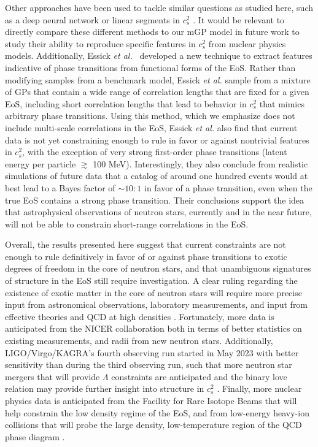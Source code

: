 \documentclass[aps,prd,nofootinbib,tightenlines,notitlepage,floatfix,superscriptaddress,showkeys,twocolumn]{revtex4-1}
\begin{document}
Other approaches have been used to tackle similar questions as studied here, such as a deep neural network \cite{Fujimoto:2019hxv} or linear segments in $c_s^2$ \cite{Somasundaram:2021clp}. It would be relevant to directly compare these different methods to our mGP model in future work to study their ability to reproduce specific features in $c_s^2$ from nuclear physics models. 
Additionally, Essick \textit{et al.}~\cite{Essick:2023fso} developed a new technique to extract features indicative of phase transitions from functional forms of the EoS.  Rather than modifying samples from a benchmark model, Essick \textit{et al.} sample from a mixture of GPs that contain a wide range of correlation lengths that are fixed for a given EoS, including short correlation lengths that lead to behavior in $c_s^2$ that mimics arbitrary phase transitions. Using this method, which we emphasize does not include multi-scale correlations in the EoS, Essick \textit{et al.} also find that current data is not yet constraining enough to rule in favor or against nontrivial features in $c_s^2$, with the exception of very strong first-order phase transitions (latent energy per particle $\gtrsim$ 100 MeV). Interestingly, they also conclude from realistic simulations of future data that a catalog of around one hundred events would at best lead to a Bayes factor of $\sim 10:1$ in favor of a phase transition, even when the true EoS contains a strong phase transition. Their conclusions support the idea that astrophysical observations of neutron stars, currently and in the near future, will not be able to constrain short-range correlations in the EoS.

Overall, the results presented here suggest that current constraints are not enough to rule definitively in favor of or against phase transitions to exotic degrees of freedom in the core of neutron stars, and that unambiguous signatures of structure in the EoS still require investigation. A clear ruling regarding the existence of exotic matter in the core of neutron stars will require more precise input from astronomical observations, laboratory measurements, and input from effective theories and QCD at high densities \cite{Lovato:2022vgq}. Fortunately, more data is anticipated from the NICER collaboration both in terms of better statistics on existing measurements, and radii from new neutron stars. Additionally, LIGO/Virgo/KAGRA's fourth observing run started in May 2023 with better sensitivity than during the third observing run, such that more neutron star mergers that will provide $\Lambda$ constraints are anticipated \cite{Carson:2019rjx} and the binary love relation may provide further insight into structure in $c_s^2$ \cite{Tan:2021nat}.  Finally, more nuclear physics data is anticipated from the Facility for Rare Isotope Beams that will help constrain the low density regime of the EoS, and from low-energy heavy-ion collisions that will probe the large density, low-temperature region of the QCD phase diagram \cite{Sorensen:2023zkk}. 
\end{document}

